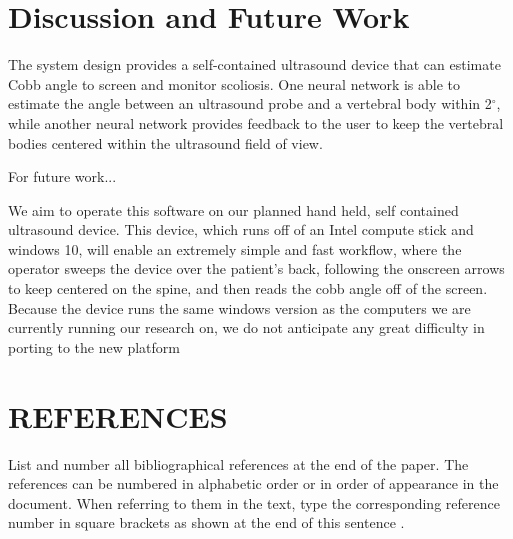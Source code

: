 \documentclass{article}
\begin{document}
\section{Discussion and Future Work}
The system design provides a self-contained ultrasound device that can estimate Cobb angle to screen and monitor scoliosis.  One neural network is able to estimate the angle between an ultrasound probe and a vertebral body within 2$^\circ$, while another neural network provides feedback to the user to keep the vertebral bodies centered within the ultrasound field of view.  

For future work...

We aim to operate this software on our planned hand held, self contained ultrasound device. This device, which runs off of an Intel compute stick and windows 10, will enable an extremely simple and fast workflow, where the operator sweeps the device over the patient’s back, following the onscreen arrows to keep centered on the spine, and then reads the cobb angle off of the screen. Because the device runs the same windows version as the computers we are currently running our research on, we do not anticipate any great difficulty in porting to the new platform


\section{REFERENCES}
\label{sec:ref}

List and number all bibliographical references at the end of the paper.  The references can be numbered in alphabetic order or in order of appearance in the document.  When referring to them in the text, type the corresponding reference number in square brackets as shown at the end of this sentence \cite{C2}.



\end{document}
